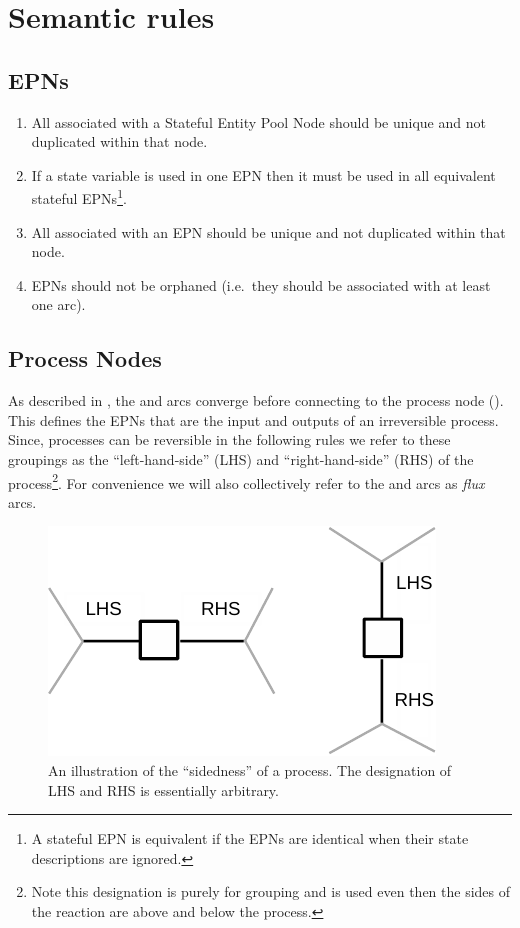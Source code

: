 \section{Semantic rules}

\subsection{EPNs}

 \begin{enumerate}
   \item All  associated with a Stateful Entity Pool Node should be unique and not duplicated within that node.
   \item If a state variable is used in one EPN then it must be used in all equivalent stateful EPNs\footnote{A stateful EPN is equivalent if the EPNs are identical when their state descriptions are ignored.}.
   \item All  associated with an EPN should be unique and not duplicated within that node.
   \item EPNs should not be orphaned (i.e.\, they should be associated with at least one arc).
 \end{enumerate}

\subsection{Process Nodes}

As described in , the  and  arcs converge before connecting to the process node (). This defines the EPNs that are the input and outputs of an irreversible process. Since, processes can be reversible in the following rules we refer to these groupings as the ``left-hand-side'' (LHS) and ``right-hand-side'' (RHS) of the process\footnote{Note this designation is purely for grouping and is used even then the sides of the reaction are above and below the process.}. For convenience we will also collectively refer to the  and  arcs as \emph{flux} arcs.

\begin{figure}[H]
  \centering
  \includegraphics[scale = 0.8]{images/build/process_sidedness.pdf}
  \caption{An illustration of the ``sidedness'' of a process. The designation of LHS and RHS is essentially arbitrary.}
  \label{fig:process-sidedness}
\end{figure}

